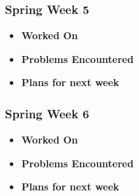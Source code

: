 \documentclass[compsoc,draftclsnofoot,onecolumn,10pt]{IEEEtran}
\begin{document}
\subsubsection{Spring Week 5}
\begin{itemize}
    \item {\textbf{Worked On}}
    \begin{itemize}
        
    \end{itemize}

    \item {\textbf{Problems Encountered}}
    \begin{itemize}
        
    \end{itemize}

    \item{\textbf{Plans for next week}}
    \begin{itemize}
        
    \end{itemize}

\end{itemize}

\subsubsection{Spring Week 6}
\begin{itemize}
    \item {\textbf{Worked On}}
    \begin{itemize}
        
    \end{itemize}

    \item {\textbf{Problems Encountered}}
    \begin{itemize}
        
    \end{itemize}

    \item{\textbf{Plans for next week}}
    \begin{itemize}
        
    \end{itemize}

\end{itemize}
\end{document}
